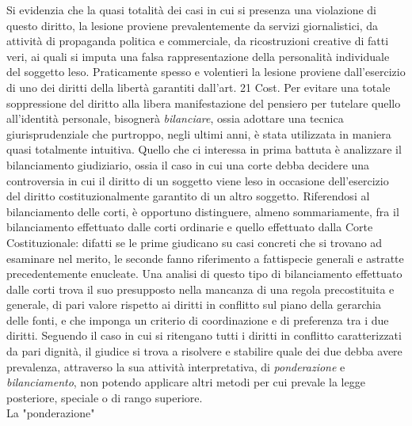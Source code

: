 Si evidenzia che la quasi totalità dei casi in cui si presenza una violazione di questo diritto, la lesione proviene prevalentemente da servizi giornalistici, da attività di propaganda politica e commerciale, da ricostruzioni creative di fatti veri, ai quali si imputa una falsa rappresentazione della personalità individuale del soggetto leso. Praticamente spesso e volentieri la lesione proviene dall’esercizio di uno dei diritti della libertà garantiti dall’art. 21 Cost. Per evitare una totale soppressione del diritto alla libera manifestazione del pensiero per tutelare quello all’identità personale, bisognerà \textit{bilanciare}, ossia adottare una tecnica giurisprudenziale che purtroppo, negli ultimi anni, è stata utilizzata in maniera quasi totalmente intuitiva.
Quello che ci interessa in prima battuta è analizzare il bilanciamento giudiziario, ossia il caso in cui una corte debba decidere una controversia in cui il diritto di un soggetto viene leso in occasione dell’esercizio del diritto costituzionalmente garantito di un altro soggetto. 
Riferendosi al bilanciamento delle corti, è opportuno distinguere, almeno sommariamente, fra il bilanciamento effettuato dalle corti ordinarie e quello effettuato dalla Corte Costituzionale: difatti se le prime giudicano su casi concreti che si trovano ad esaminare nel merito, le seconde fanno riferimento a fattispecie generali e astratte precedentemente enucleate. Una analisi di questo tipo di bilanciamento effettuato dalle corti trova il suo presupposto nella mancanza di una regola precostituita e generale, di pari valore rispetto ai diritti in conflitto sul piano della gerarchia delle fonti, e che imponga un criterio di coordinazione e di preferenza tra i due diritti.
Seguendo il caso in cui si ritengano tutti i diritti in conflitto caratterizzati da pari dignità, il giudice si trova a risolvere e stabilire quale dei due debba avere prevalenza, attraverso la sua attività interpretativa, di \textit{ponderazione} e \textit{bilanciamento}, non potendo applicare altri metodi per cui prevale la legge posteriore, speciale o di rango superiore. %
\\La "ponderazione"
